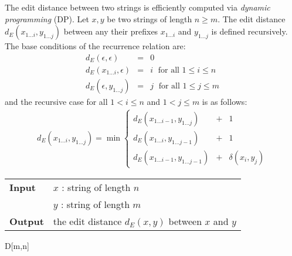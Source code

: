 The edit distance between two strings is efficiently computed via \emph{dynamic programming} (DP).
Let $x,y$ be two strings of length $n \geq m$.
The edit distance $d_E(x_{1 \dots i},y_{1 \dots j})$ between any their prefixes $x_{1 \dots i}$ and $y_{1 \dots j}$ is defined recursively.
The base conditions of the recurrence relation are:
\begin{eqnarray}
d_E(\epsilon,\epsilon)&=&0\label{eq:dp-ee}\\
d_E(x_{1 \dots i},\epsilon)&=&i \; \text{ for all } 1 \leq i \leq n\label{eq:dp-row}\\
d_E(\epsilon, y_{1 \dots j})&=&j \; \text{ for all } 1 \leq j \leq m\label{eq:dp-col}
\end{eqnarray}
and the recursive case for all $1 < i \leq n$ and $1 < j \leq m$ is as follows:
\begin{eqnarray}
d_E(x_{1\dots i},y_{1 \dots j}) = \min \left\{
\begin{array}{lcl}
d_E(x_{1 \dots i-1},y_{1 \dots j})&+&1\\
d_E(x_{1 \dots i},y_{1 \dots j-1})&+&1\\
d_E(x_{1 \dots i-1},y_{1 \dots j-1})&+&\delta(x_i, y_j)
\end{array}
\right.\label{eq:dp-min}
\end{eqnarray}

\begin{figure*}[b!]
\begin{center}
\begin{minipage}[t]{.9\textwidth}
\begin{algorithm}[H]
\begin{tabular}{ll}
\textbf{Input}  & $x$ : string of length $n$\\
				& $y$ : string of length $m$\\
\textbf{Output} & the edit distance $d_E(x,y)$ between $x$ and $y$\\
\end{tabular}
\begin{algorithmic}[1]
\EndFor
{}
	\EndFor
\EndFor
\State \Return D[m,n]
\end{algorithmic}
\label{alg:dp-edit}
\end{algorithm}
\end{minipage}
\end{center}
\end{figure*}

